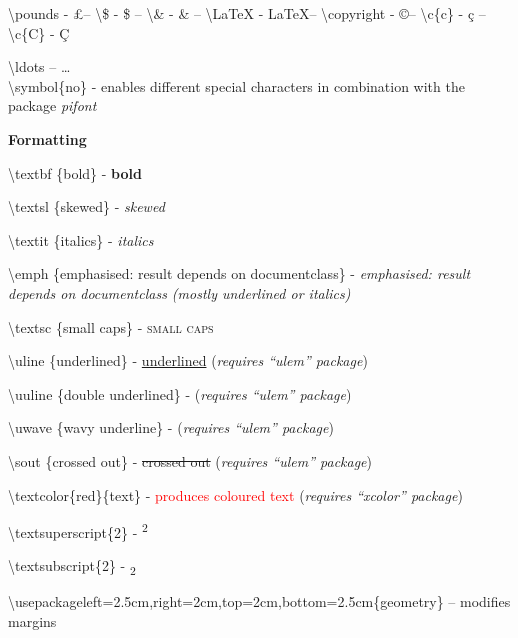 \documentclass[a4paper,12pt,final]{article}
\begin{document}

\textbackslash pounds - \pounds -- \textbackslash \$ - \$ -- \textbackslash \& - \& -- \textbackslash LaTeX - \LaTeX -- \textbackslash copyright - \copyright -- \textbackslash c\{c\} - \c{c} -- \textbackslash c\{C\} - \c{C} 

\textbackslash ldots -- \ldots \\

\textbackslash symbol\{no\} - enables different special characters in combination with the package \textsl{pifont} %

\newpage
\large \textbf{Formatting}
\normalsize

\textbackslash textbf \{bold\} - \textbf{bold}

\textbackslash textsl \{skewed\} - \textsl{skewed}

\textbackslash textit \{italics\} - \textit{italics}

\textbackslash emph \{emphasised:  result depends on documentclass\} - \emph{emphasised: result depends on documentclass (mostly underlined or italics)}

\textbackslash textsc \{small caps\} - \textsc{small caps}

\textbackslash uline \{underlined\} - \uline{underlined} (\textsl{requires ``ulem'' package})

\textbackslash uuline \{double underlined\} -  (\textsl{requires ``ulem'' package})

\textbackslash uwave \{wavy underline\} -  (\textsl{requires ``ulem'' package})

\textbackslash sout \{crossed out\} - \sout{crossed out} (\textsl{requires ``ulem'' package})

\textbackslash textcolor\{red\}\{text\} - \textcolor{red}{produces coloured text} (\textsl{requires ``xcolor'' package})

\textbackslash textsuperscript\{2\} - \textsuperscript{2}

\textbackslash textsubscript\{2\} - \textsubscript{2}

\textbackslash usepackage\lbrack left=2.5cm,right=2cm,top=2cm,bottom=2.5cm\rbrack\{geometry\} -- modifies margins \\
\end{document}
